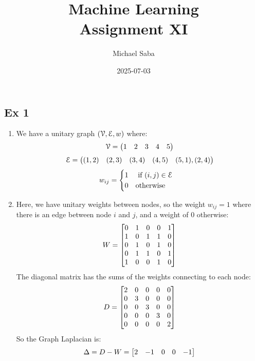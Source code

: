 \documentclass[12pt]{article}
\title{
    \Huge Machine Learning \\
    \Large Assignment XI
}
\date{2025-07-03}
\author{Michael Saba}
\begin{document}
\maketitle
\newpage
\setlength{\parindent}{0pt}

\subsection*{Ex 1}

\begin{enumerate}[label = \letters]
    \item
    We have a unitary graph $(\mathcal{V}, \mathcal{E}, w)$ where:
    \[ \mathcal{V} = \begin{pmatrix} 1 & 2 & 3 & 4 & 5 \end{pmatrix} \]
    \[ \mathcal{E} = \begin{pmatrix} (1, 2) & (2,3) & (3, 4) & 
    (4, 5) & (5, 1), (2, 4) \end{pmatrix} \]
    \[ w_{ij} = \begin{cases} 
        1 \quad \text{ if } (i, j) \in \mathcal{E} \\
        0 \quad \text{otherwise}       
     \end{cases}  \]
    \item 
    Here, we have unitary weights between nodes,
    so the weight $w_{ij} = 1$ where there is an edge
    between node $i$ and $j$, and a weight of $0$
    otherwise:
    \[ W = \begin{bmatrix} 
        0 & 1 & 0 & 0 & 1 \\
        1 & 0 & 1 & 1 & 0 \\
        0 & 1 & 0 & 1 & 0 \\
        0 & 1 & 1 & 0 & 1 \\
        1 & 0 & 0 & 1 & 0 \\
     \end{bmatrix} \]
    The diagonal matrix has the sums of the weights
    connecting to each node:
     \[ D = \begin{bmatrix} 
        2 & 0 & 0 & 0 & 0 \\
        0 & 3 & 0 & 0 & 0 \\
        0 & 0 & 3 & 0 & 0 \\
        0 & 0 & 0 & 3 & 0 \\
        0 & 0 & 0 & 0 & 2 \\
     \end{bmatrix} \]
    So the Graph Laplacian is:
    \[ \Delta = D - W = \begin{bmatrix} 
        2 & -1 & 0 & 0 & -1 \\
 \end{bmatrix}\]
\end{enumerate}
\end{document}
